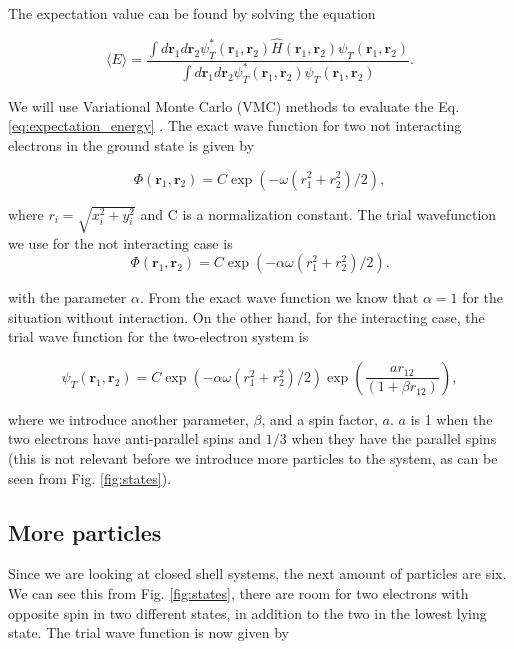 The expectation value can be found by solving the equation

\begin{equation}\label{eq:expectation_energy}
   \langle E \rangle =
   \frac{\int d\bm{r}_1d\bm{r}_2\psi^{\ast}_T(\bm{r}_1,\bm{r}_2)\hat{H}(\bm{r}_1,\bm{r}_2)\psi_T(\bm{r}_1,\bm{r}_2)}
        {\int d\bm{r}_1d\bm{r}_2\psi^{\ast}_T(\bm{r}_1,\bm{r}_2)\psi_T(\bm{r}_1,\bm{r}_2)}.
\end{equation}

We will use Variational Monte Carlo (VMC) methods to evaluate the Eq. \ref{eq:expectation_energy} \cite{project1}. The exact wave function for two not interacting electrons in the ground state is given by

\begin{equation*}
\Phi(\bm{r}_1,\bm{r}_2) = C\exp{\left(-\omega(r_1^2+r_2^2)/2\right)},
\end{equation*}

where $r_i = \sqrt{x_i^2+y_i^2}$ and C is a normalization constant. The trial wavefunction we use for the not interacting case is 
\begin{equation}\label{eq:trial_wf_not_interacing}
\Phi(\bm{r}_1,\bm{r}_2) = C\exp{\left(-\alpha\omega(r_1^2+r_2^2)/2\right)}.
\end{equation}

with the parameter $\alpha$. From the exact wave function we know that $\alpha = 1$ for the situation without interaction. On the other hand, for the interacting case, the trial wave function for the two-electron system is

\begin{equation}
   \psi_{T}(\bm{r}_1,\bm{r}_2) = 
   C\exp{\left(-\alpha\omega(r_1^2+r_2^2)/2\right)}
   \exp{\left(\frac{ar_{12}}{(1+\beta r_{12})}\right)}, 
\label{eq:trial_interacting}
\end{equation}

where we introduce another parameter, $\beta$, and a spin factor, $a$. $a$ is 1 when the two electrons have anti-parallel spins and $1/3$ when they have the parallel spins (this is not relevant before we introduce more particles to the system, as can be seen from Fig. \ref{fig:states}).

\subsection{More particles}

Since we are looking at closed shell systems, the next amount of particles are six. We can see this from Fig. \ref{fig:states}, there are room for two electrons with opposite spin in two different states, in addition to the two in the lowest lying state. The trial wave function is now given by

